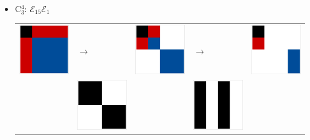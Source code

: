 \documentclass[11pt,dvipsnames]{article} %
\newcommand{\E}{\mathcal{E}}
\newcommand{\1}{\mathds{1}}
\begin{document}
\begin{itemize}
\begin{itemize}
\pagebreak
\item C$_3^4$: $\E_{15}\E_{1}$\newline
\begin{tabular}{m{2cm} m{2cm} m{2cm} m{2cm} m{2cm}}
\includegraphics[width=2.2cm]{img-JA/id}  
& \hspace{0.8cm}$\longrightarrow$ 
& \includegraphics[width=2.2cm]{img-JA/8comp} 
& \hspace{0.8cm}$\longrightarrow$ 
& \includegraphics[width=2.2cm]{C43}\\ 
 & \includegraphics[width=2.2cm]{img-JA/16To8} &  
 & \includegraphics[width=2.2cm]{ruleC81_2} &\\ 
\end{tabular} 


\end{itemize}
\end{itemize}
\end{document}
